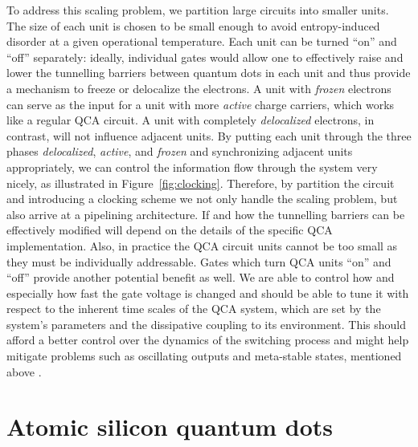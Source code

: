 To address this scaling problem, we partition large circuits into smaller units.
The size of each unit is chosen to be small enough to avoid entropy-induced
disorder at a given operational temperature. Each unit can be turned ``on'' and
``off'' separately: ideally, individual gates would allow one to effectively
raise and lower the tunnelling barriers between quantum dots in each unit and
thus provide a mechanism to freeze or delocalize the electrons. A unit with
\emph{frozen} electrons can serve as the input for a unit with more
\emph{active} charge carriers, which works like a regular QCA circuit. A unit
with completely \emph{delocalized} electrons, in contrast, will not influence
adjacent units. By putting each unit through the three phases
\emph{delocalized}, \emph{active}, and \emph{frozen} and synchronizing adjacent
units appropriately, we can control the information flow through the system very
nicely, as illustrated in Figure~\ref{fig:clocking}. Therefore, by partition
the circuit and introducing a clocking scheme we not only handle the scaling
problem, but also arrive at a pipelining architecture. If and how the
tunnelling barriers can be effectively modified will depend on the details of
the specific QCA implementation. Also, in practice the QCA circuit units cannot
be too small as they must be individually addressable. Gates which turn QCA
units ``on'' and ``off'' provide another potential benefit as well. We are able
to control how and especially how fast the gate voltage is changed and should be
able to tune it with respect to the inherent time scales of the QCA system,
which are set by the system's parameters and the dissipative coupling to its
environment. This should afford a better control over the dynamics of the
switching process and might help mitigate problems such as oscillating outputs
and meta-stable states, mentioned above \cite{lent1997device}.


\section{Atomic silicon quantum dots}
\label{sec:atomic_silicon_quantum_dots}

